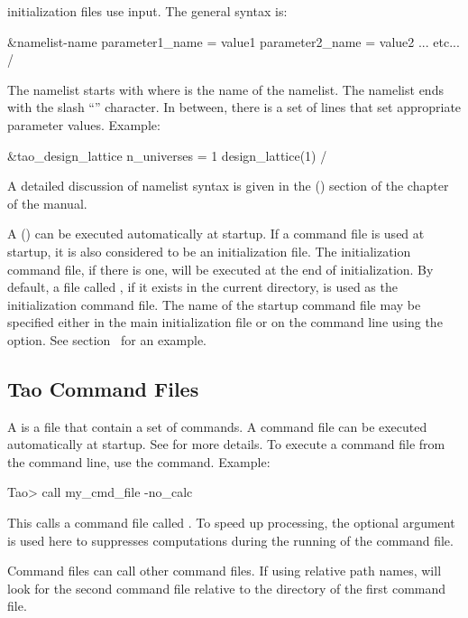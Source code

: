 \documentclass{hitec}     %
\begin{document}
\tao initialization files use  input. The general syntax is:
\begin{code}
&namelist-name
  parameter1_name = value1
  parameter2_name = value2
  ... etc...
/
\end{code}
The namelist starts with  where  is the name of the
namelist. The namelist ends with the slash ``\vn{/}'' character. In between, there is a set of lines
that set appropriate parameter values. Example:
\begin{code}
&tao_design_lattice
  n_universes = 1
  design_lattice(1)%
/
\end{code}
A detailed discussion of namelist syntax is given in the  ()
section of the  chapter of the \tao manual.

A  () can be executed automatically at startup. If a command file
is used at startup, it is also considered to be an initialization file. The initialization command
file, if there is one, will be executed at the end of initialization.  By default, a file called
, if it exists in the current directory, is used as the initialization command
file. The name of the startup command file may be specified either in the main initialization file
or on the command line using the  option. See section~ for an example.

\subsection{Tao Command Files}
\label{s:cmd.file}

A  is a file that contain a set of \tao commands. A command file can be executed
automatically at startup. See  for more details. To execute a command file from
the \tao command line, use the  command. Example:
\begin{code}
Tao> call my_cmd_file -no_calc
\end{code}
This calls a command file called . To speed up processing, the 
optional argument is used here to suppresses computations during the running of the command file.

Command files can call other command files. If using relative path names, \tao will look for the
second command file relative to the directory of the first command file.
\end{document}
